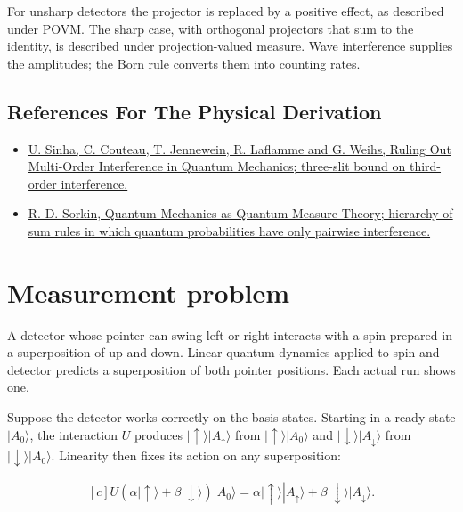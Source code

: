\documentclass[11pt,oneside]{book}
\newenvironment{centeredalign}{\[\begin{gathered}[c]}{\end{gathered}\]}
\begin{document}
For unsharp detectors the projector is replaced by a positive effect, as described under POVM. The sharp case, with orthogonal projectors that sum to the identity, is described under projection-valued measure. Wave interference supplies the amplitudes; the Born rule converts them into counting rates.

\subsection*{References For The Physical Derivation}
\begin{itemize}
\item \href{https://arxiv.org/abs/1007.4193}{U. Sinha, C. Couteau, T. Jennewein, R. Laflamme and G. Weihs, Ruling Out Multi-Order Interference in Quantum Mechanics; three-slit bound on third-order interference.}
\item \href{https://arxiv.org/abs/gr-qc/9401003}{R. D. Sorkin, Quantum Mechanics as Quantum Measure Theory; hierarchy of sum rules in which quantum probabilities have only pairwise interference.}
\end{itemize}





\clearpage

\section{Measurement problem}

\label{topic:measurement-problem}

A detector whose pointer can swing left or right interacts with a spin prepared in a superposition of up and down. Linear quantum dynamics applied to spin and detector predicts a superposition of both pointer positions. Each actual run shows one.

Suppose the detector works correctly on the basis states. Starting in a ready state \(|A_0\rangle\), the interaction \(U\) produces \(|{\uparrow}\rangle|A_\uparrow\rangle\) from \(|{\uparrow}\rangle|A_0\rangle\) and \(|{\downarrow}\rangle|A_\downarrow\rangle\) from \(|{\downarrow}\rangle|A_0\rangle\). Linearity then fixes its action on any superposition:

\begin{centeredalign}
U(\alpha|{\uparrow}\rangle+\beta|{\downarrow}\rangle)|A_0\rangle
=\alpha|{\uparrow}\rangle|A_\uparrow\rangle+\beta|{\downarrow}\rangle|A_\downarrow\rangle.
\end{centeredalign}
\end{document}
